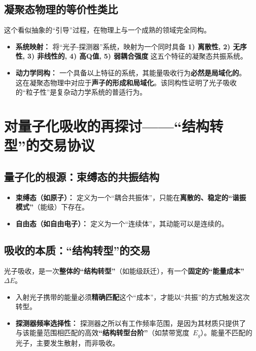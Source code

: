 \documentclass[12pt]{article}
\begin{document}
\subsection{凝聚态物理的等价性类比}

这个看似抽象的``引导''过程，在物理上与一个成熟的领域完全同构。

\begin{itemize}
    \item \textbf{系统映射：} 将``光子-探测器''系统，映射为一个同时具备 \textbf{1) 离散性, 2) 无序性, 3) 非线性的, 4) 高Q值, 5) 弱耦合强度} 这五个特征的凝聚态共振系统。
    \item \textbf{动力学同构：} 一个具备以上特征的系统，其能量吸收行为\textbf{必然是局域化的}。这在凝聚态物理中对应于\textbf{声子的形成和局域化}。该同构性证明了光子吸收的``粒子性''是复杂动力学系统的普适行为。
\end{itemize}

\section{对量子化吸收的再探讨——``结构转型''的交易协议}

\subsection{量子化的根源：束缚态的共振结构}

\begin{itemize}
    \item \textbf{束缚态（如原子）：} 定义为一个``耦合共振体''，只能在\textbf{离散的、稳定的``谐振模式''}（能级）下存在。
    \item \textbf{自由态（如自由电子）：} 定义为一个``连续体''，其动能可以是连续的。
\end{itemize}

\subsection{吸收的本质：``结构转型''的交易}

光子吸收，是一次\textbf{整体的``结构转型''}（如能级跃迁），有一个\textbf{固定的``能量成本''~$\Delta E$}。

\begin{itemize}
    \item 入射光子携带的能量必须\textbf{精确匹配}这个``成本''，才能以``共振''的方式触发这次转型。
    \item \textbf{探测器频率选择性：} 探测器之所以有工作频率范围，是因为其材质只提供了与该能量范围相匹配的高效\textbf{``结构转型台阶''}（如禁带宽度~$E_g$）。能量不匹配的光子，主要发生散射，而非吸收。
\end{itemize}
\end{document}
